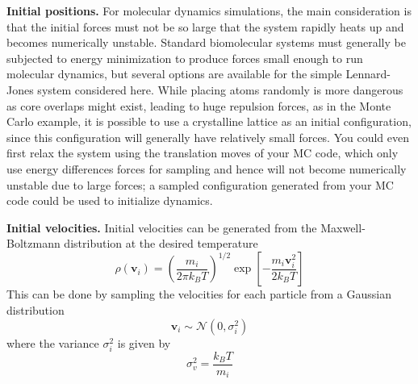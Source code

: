 \documentclass[aip,jcp,preprint,superscriptaddress,floatfix]{revtex4-1}
\begin{document}
\textbf{Initial positions.} 
For molecular dynamics simulations, the main consideration is that the initial forces must not be so large that the system rapidly heats up and becomes numerically unstable.
Standard biomolecular systems must generally be subjected to energy minimization to produce forces small enough to run molecular dynamics, but several options are available for the simple Lennard-Jones system considered here.
While placing atoms randomly is more dangerous as core overlaps might exist, leading to huge repulsion forces, as in the Monte Carlo example, it is possible to use a crystalline lattice as an initial configuration, since this configuration will generally have relatively small forces. 
You could even first relax the system using the translation moves of your MC code, which only use energy differences forces for sampling and hence will not become numerically unstable due to large forces; a sampled configuration generated from your MC code could be used to initialize dynamics.

\textbf{Initial velocities.} 
Initial velocities can be generated from the Maxwell-Boltzmann distribution at the desired temperature
\begin{equation}
	\rho \left(\mathbf{v}_i\right) = \left( \frac{m_i}{2 \pi k_B T} \right)^{1/2} \exp \left[ - \frac{m_i \mathbf{v}_i^2 } {2 k_B T }  \right]
\end{equation}
This can be done by sampling the velocities for each particle from a Gaussian distribution
\begin{equation}
       \mathbf{v}_i \sim \mathcal{N}(0, \sigma_i^2)
\end{equation}
where the variance $\sigma_i^2$ is given by
\begin{equation}
	\sigma_v^2 = \frac{k_B T}{m_i}
\end{equation}

\end{document}
